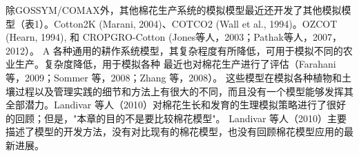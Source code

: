 除GOSSYM/COMAX外，其他棉花生产系统的模拟模型最近还开发了其他模拟模型（表1）。Cotton2K (Marani, 2004)、COTCO2 (Wall et al., 1994)。OZCOT (Hearn, 1994), 和 CROPGRO-Cotton (Jones等人，2003；Pathak等人，2007，2012）。%
A 各种通用的耕作系统模型，其复杂程度有所降低，可用于模拟不同的农业生产。复杂度降低，用于模拟各种 最近也对棉花生产进行了评估（Farahani 等，2009；Sommer 等，2008；Zhang 等，2008）。%
这些模型在模拟各种植物和土壤过程以及管理实践的细节和方法上有很大的不同，而且没有一个模型能够发挥其全部潜力。Landivar 等人（2010）对棉花生长和发育的生理模拟策略进行了很好的回顾；但是，"本章的目的不是要比较棉花模型"。%
Landivar 等人（2010）主要描述了模型的开发方法，没有对比现有的棉花模型，也没有回顾棉花模型应用的最新进展。%

